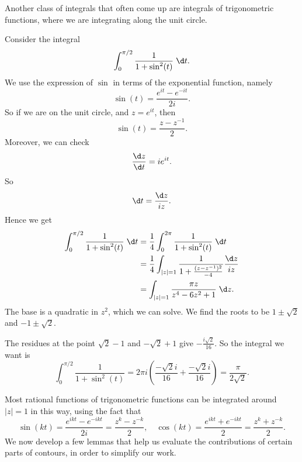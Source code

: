 \documentclass[a4paper]{article}
\begin{document}
Another class of integrals that often come up are integrals of trigonometric functions, where we are integrating along the unit circle.
\begin{eg}
  Consider the integral
  \[
    \int_0^{\pi/2} \frac{1}{1 + \sin^2(t)}\;\d t.
  \]
  We use the expression of $\sin$ in terms of the exponential function, namely
  \[
    \sin(t) = \frac{e^{it} - e^{-it}}{2i}.
  \]
  So if we are on the unit circle, and $z = e^{it}$, then
  \[
    \sin (t) = \frac{z - z^{-1}}{2}.
  \]
  Moreover, we can check
  \[
    \frac{\d z}{\d t} = ie^{it}.
  \]
  So
  \[
    \d t = \frac{\d z}{iz}.
  \]
  Hence we get
  \begin{align*}
    \int_0^{\pi/2} \frac{1}{1 + \sin^2(t)} \;\d t &= \frac{1}{4} \int_0^{2\pi} \frac{1}{1 + \sin^2 (t)}\;\d t\\
    &= \frac{1}{4} \int_{|z| = 1} \frac{1}{1 + \frac{(z - z^{-1})^2}{-4}} \frac{\d z}{iz}\\
    &= \int_{|z| = 1}\frac{\pi z}{z^4 - 6z^2 + 1}\;\d z.
  \end{align*}
  The base is a quadratic in $z^2$, which we can solve. We find the roots to be $1 \pm \sqrt{2}$ and $-1 \pm \sqrt{2}$.
  \begin{center}
  \end{center}
  The residues at the point $\sqrt{2} - 1$ and $-\sqrt{2} + 1$ give $-\frac{i\sqrt{2}}{16}$. So the integral we want is
  \[
    \int_0^{\pi/2} \frac{1}{1 + \sin^2(t)} = 2\pi i\left(\frac{-\sqrt{2}i}{16} + \frac{-\sqrt{2} i}{16}\right) = \frac{\pi}{2\sqrt{2}}.
  \]
\end{eg}
Most rational functions of trigonometric functions can be integrated around $|z| = 1$ in this way, using the fact that
\[
  \sin (kt) = \frac{e^{ikt} - e^{-ikt}}{2i} = \frac{z^k - z^{-k}}{2},\quad \cos(kt) = \frac{e^{ikt} + e^{-ikt}}{2} = \frac{z^k + z^{-k}}{2}.
\]
We now develop a few lemmas that help us evaluate the contributions of certain parts of contours, in order to simplify our work.
\end{document}
